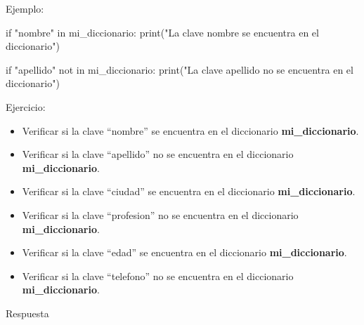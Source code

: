 \documentclass[
  a4paper,
  DIV=11,
  numbers=noendperiod,
  onepage,
  openany]{scrreprt}
\newenvironment{Shaded}{\begin{snugshade}}{\end{snugshade}}
\newcommand{\BuiltInTok}[1]{\textcolor[rgb]{0.00,0.23,0.31}{#1}}
\newcommand{\ControlFlowTok}[1]{\textcolor[rgb]{0.00,0.23,0.31}{#1}}
\newcommand{\KeywordTok}[1]{\textcolor[rgb]{0.00,0.23,0.31}{#1}}
\newcommand{\NormalTok}[1]{\textcolor[rgb]{0.00,0.23,0.31}{#1}}
\newcommand{\StringTok}[1]{\textcolor[rgb]{0.13,0.47,0.30}{#1}}
\providecommand{\tightlist}{%
  \setlength{\itemsep}{0pt}\setlength{\parskip}{0pt}}\usepackage{longtable,booktabs,array}
\begin{document}
Ejemplo:

\begin{Shaded}
\begin{Highlighting}[]
\ControlFlowTok{if} \StringTok{"nombre"} \KeywordTok{in}\NormalTok{ mi\_diccionario:}
    \BuiltInTok{print}\NormalTok{(}\StringTok{"La clave \textquotesingle{}nombre\textquotesingle{} se encuentra en el diccionario"}\NormalTok{)}

\ControlFlowTok{if} \StringTok{"apellido"} \KeywordTok{not} \KeywordTok{in}\NormalTok{ mi\_diccionario:}
    \BuiltInTok{print}\NormalTok{(}\StringTok{"La clave \textquotesingle{}apellido\textquotesingle{} no se encuentra en el diccionario"}\NormalTok{)}
\end{Highlighting}
\end{Shaded}

Ejercicio:

\begin{itemize}
\tightlist
\item
  Verificar si la clave ``nombre'' se encuentra en el diccionario
  \textbf{mi\_diccionario}.
\item
  Verificar si la clave ``apellido'' no se encuentra en el diccionario
  \textbf{mi\_diccionario}.
\item
  Verificar si la clave ``ciudad'' se encuentra en el diccionario
  \textbf{mi\_diccionario}.
\item
  Verificar si la clave ``profesion'' no se encuentra en el diccionario
  \textbf{mi\_diccionario}.
\item
  Verificar si la clave ``edad'' se encuentra en el diccionario
  \textbf{mi\_diccionario}.
\item
  Verificar si la clave ``telefono'' no se encuentra en el diccionario
  \textbf{mi\_diccionario}.
\end{itemize}

Respuesta
\end{document}
